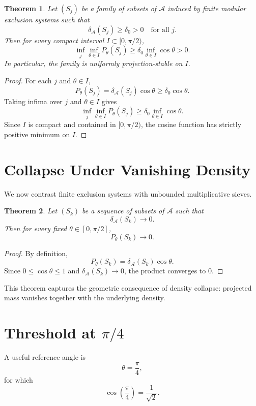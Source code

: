 \documentclass[11pt]{article}
\theoremstyle{plain}
\newtheorem{theorem}{Theorem}
\theoremstyle{definition}
\begin{document}
\begin{theorem}
Let $(S_j)$ be a family of subsets of $\mathcal{A}$ induced by finite modular exclusion systems such that
\[
\delta_{\mathcal{A}}(S_j) \ge \delta_0 > 0
\quad\text{for all } j.
\]
Then for every compact interval $I \subset [0,\pi/2)$,
\[
\inf_j \inf_{\theta \in I} P_\theta(S_j) \ge \delta_0 \inf_{\theta \in I}\cos\theta > 0.
\]
In particular, the family is uniformly projection-stable on $I$.
\end{theorem}

\begin{proof}
For each $j$ and $\theta \in I$,
\[
P_\theta(S_j)=\delta_{\mathcal{A}}(S_j)\cos\theta \ge \delta_0 \cos\theta.
\]
Taking infima over $j$ and $\theta \in I$ gives
\[
\inf_j \inf_{\theta \in I} P_\theta(S_j)
\ge
\delta_0 \inf_{\theta \in I}\cos\theta.
\]
Since $I$ is compact and contained in $[0,\pi/2)$, the cosine function has strictly positive minimum on $I$.
\end{proof}

\section{Collapse Under Vanishing Density}

We now contrast finite exclusion systems with unbounded multiplicative sieves.

\begin{theorem}
Let $(S_k)$ be a sequence of subsets of $\mathcal{A}$ such that
\[
\delta_{\mathcal{A}}(S_k)\to 0.
\]
Then for every fixed $\theta \in [0,\pi/2]$,
\[
P_\theta(S_k)\to 0.
\]
\end{theorem}

\begin{proof}
By definition,
\[
P_\theta(S_k)=\delta_{\mathcal{A}}(S_k)\cos\theta.
\]
Since $0 \le \cos\theta \le 1$ and $\delta_{\mathcal{A}}(S_k)\to 0$, the product converges to $0$.
\end{proof}

This theorem captures the geometric consequence of density collapse: projected mass vanishes together with the underlying density.

\section{Threshold at $\pi/4$}

A useful reference angle is
\[
\theta = \frac{\pi}{4},
\]
for which
\[
\cos\left(\frac{\pi}{4}\right)=\frac{1}{\sqrt{2}}.
\]
\end{document}
